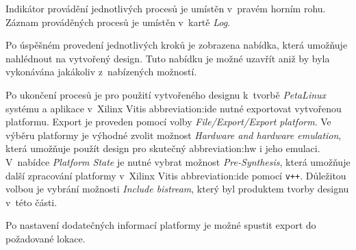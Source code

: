 \documentclass[a4paper, twoside, 11pt]{article}
\newcommand{\fbar}{\FloatBarrier}
\begin{document}
\begin{appendices}
		\fbar
		Indikátor provádění jednotlivých procesů je umístěn v~pravém horním rohu. Záznam prováděných procesů je umístěn v~kartě \textit{Log}.\par
		Po úspěšném provedení jednotlivých kroků je zobrazena nabídka, která umožňuje nahlédnout na vytvořený design. Tuto nabídku je možné uzavřít aniž by byla vykonávána jakákoliv z~nabízených možností.\par
		Po ukončení procesů je pro použití vytvořeného designu k~tvorbě \textit{PetaLinux} systému a aplikace v~Xilinx Vitis \gls{abbreviation:ide} nutné exportovat vytvořenou platformu. Export je proveden pomocí volby \textit{File/Export/Export platform}. Ve výběru platformy je výhodné zvolit možnost \textit{Hardware and hardware emulation}, která umožňuje použít design pro skutečný \gls{abbreviation:hw} i jeho emulaci. V~nabídce \textit{Platform State} je nutné vybrat možnost \textit{Pre-Synthesis}, která umožňuje další zpracování platformy v~Xilinx Vitis \gls{abbreviation:ide} pomocí \texttt{v++}. Důležitou volbou je vybrání možnosti \textit{Include bistream}, který byl produktem tvorby designu v~této části.\par
		Po nastavení dodatečných informací platformy je možné spustit export do požadované lokace.



\end{appendices}
\end{document}
